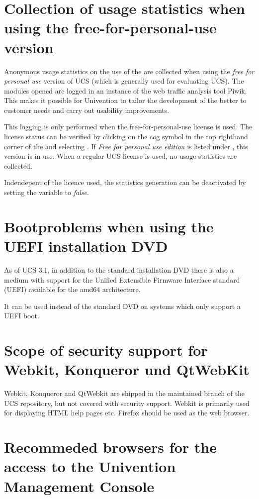 \section{Collection of usage statistics when using the free-for-personal-use version}

Anonymous usage statistics on the use of the \ucsUMC{} are collected when using the \emph{free for
personal use} version of UCS (which is generally used for evaluating UCS). The modules
opened are logged in an instance of the web traffic analysis tool Piwik. This makes it
possible for Univention to tailor the development of the \ucsUMC{} better to customer needs
and carry out usability improvements.

This logging is only performed when the free-for-personal-use license
is used. The license status can be verified by clicking on the cog
symbol in the top righthand corner of the \ucsUMC{} and
selecting . If \emph{Free for personal use
edition} is listed under , this version is in
use. When a regular UCS license is used, no usage statistics are
collected.

Indendepent of the licence used, the statistics generation can be
deactivated by setting the \ucsUCR{} variable  to \emph{false}.

\section{Bootproblems when using the UEFI installation DVD}
As of UCS 3.1, in addition to the standard installation DVD there is
also a medium with support for the Unified Extensible Firmware
Interface standard (UEFI) available for the amd64 architecture.

It can be used instead of the standard DVD on systems which only
support a UEFI boot.

\section{Scope of security support for Webkit, Konqueror und QtWebKit}
Webkit, Konqueror and QtWebkit are shipped in the maintained branch of
the UCS repository, but not covered with security support. Webkit is
primarily used for displaying HTML help pages etc. Firefox should be
used as the web browser.

\section{Recommeded browsers for the access to the Univention Management Console}

